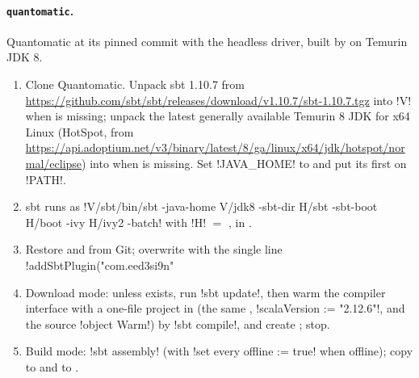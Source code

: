 {\paragraph{\texttt{quantomatic}.} Quantomatic at its pinned commit with the headless driver, built by  on Temurin JDK 8.
\begin{enumerate}
\item Clone Quantomatic. Unpack sbt 1.10.7 from \url{https://github.com/sbt/sbt/releases/download/v1.10.7/sbt-1.10.7.tgz} into \code!V! when  is missing; unpack the latest generally available Temurin 8 JDK for x64 Linux (HotSpot, from \url{https://api.adoptium.net/v3/binary/latest/8/ga/linux/x64/jdk/hotspot/normal/eclipse}) into  when  is missing. Set \code!JAVA_HOME! to  and put its  first on \code!PATH!.
\item sbt runs as \code!V/sbt/bin/sbt -java-home V/jdk8 -sbt-dir H/sbt -sbt-boot H/boot -ivy H/ivy2 -batch! with \code!H! $=$ , in .
\item Restore  and  from Git; overwrite  with the single line \code!addSbtPlugin("com.eed3si9n" %
\item Download mode: unless  exists, run \code!sbt update!, then warm the compiler interface with a one-file project in  (the same , \code!scalaVersion := "2.12.6"!, and the source \code!object Warm!) by \code!sbt compile!, and create ; stop.
\item Build mode: \code!sbt assembly! (with \code!set every offline := true! when offline); copy  to  and  to .
\end{enumerate}

}
